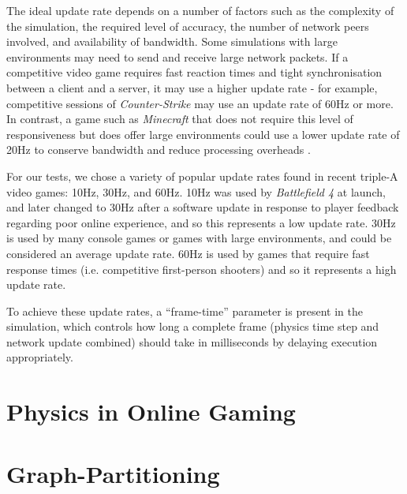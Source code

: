 The ideal update rate depends on a number of factors such as the complexity of the simulation, the required level of accuracy, the number of network peers involved, and availability of bandwidth. Some simulations with large environments may need to send and receive large network packets. If a competitive video game requires fast reaction times and tight synchronisation between a client and a server, it may use a higher update rate - for example, competitive sessions of \textit{Counter-Strike} may use an update rate of 60Hz or more. In contrast, a game such as \textit{Minecraft} that does not require this level of responsiveness but does offer large environments could use a lower update rate of 20Hz to conserve bandwidth and reduce processing overheads \cite{lee2015evaluation}.

For our tests, we chose a variety of popular update rates found in recent triple-A video games: 10Hz, 30Hz, and 60Hz. 10Hz was used by \textit{Battlefield 4} at launch, and later changed to 30Hz after a software update in response to player feedback regarding poor online experience, and so this represents a low update rate. 30Hz is used by many console games or games with large environments, and could be considered an average update rate. 60Hz is used by games that require fast response times (i.e. competitive first-person shooters) and so it represents a high update rate.

To achieve these update rates, a ``frame-time'' parameter is present in the simulation, which controls how long a complete frame (physics time step and network update combined) should take in milliseconds by delaying execution appropriately.

\section{Physics in Online Gaming}

\section{Graph-Partitioning}

